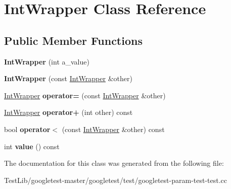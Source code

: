 \hypertarget{classIntWrapper}{}\section{Int\+Wrapper Class Reference}
\label{classIntWrapper}
\subsection*{Public Member Functions}
\begin{DoxyCompactItemize}
\item 
\mbox{\label{classIntWrapper_a1d35e0d0b9c0fc109a8d2a2118ae6010}} 
{\bfseries Int\+Wrapper} (int a\+\_\+value)
\item 
\mbox{\label{classIntWrapper_af23efe3c8d8bf176948922b41e8f253e}} 
{\bfseries Int\+Wrapper} (const \hyperlink{classIntWrapper}{Int\+Wrapper} \&other)
\item 
\mbox{\label{classIntWrapper_a39077b3c0eb1dd8a296a81bfb0a047b3}} 
\hyperlink{classIntWrapper}{Int\+Wrapper} {\bfseries operator=} (const \hyperlink{classIntWrapper}{Int\+Wrapper} \&other)
\item 
\mbox{\label{classIntWrapper_abf97bd11dd2825f3cb9e4d9f48152b56}} 
\hyperlink{classIntWrapper}{Int\+Wrapper} {\bfseries operator+} (int other) const
\item 
\mbox{\label{classIntWrapper_a940fd2978cdf7849281f11b32df94163}} 
bool {\bfseries operator$<$} (const \hyperlink{classIntWrapper}{Int\+Wrapper} \&other) const
\item 
\mbox{\label{classIntWrapper_a6103e9dc5eb94678985e3c2ac481b508}} 
int {\bfseries value} () const
\end{DoxyCompactItemize}


The documentation for this class was generated from the following file\+:\begin{DoxyCompactItemize}
\item 
Test\+Lib/googletest-\/master/googletest/test/googletest-\/param-\/test-\/test.\+cc\end{DoxyCompactItemize}
